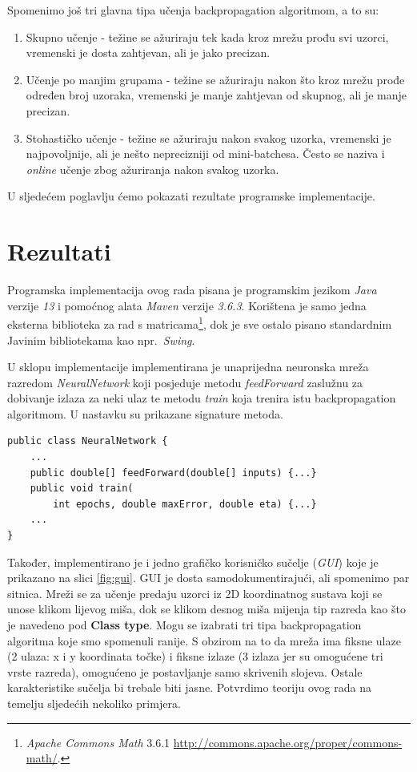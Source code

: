 \documentclass[times, utf8, zavrsni]{fer}
\begin{document}
\bigskip

Spomenimo još tri glavna tipa učenja backpropagation algoritmom, a to su:
\begin{enumerate}
    \item Skupno učenje  - težine se ažuriraju tek kada kroz mrežu prođu svi uzorci, vremenski je dosta zahtjevan, ali je jako precizan.
    \item Učenje po manjim grupama  - težine se ažuriraju nakon što kroz mrežu prođe određen broj uzoraka, vremenski je manje zahtjevan od skupnog, ali je manje precizan.
    \item Stohastičko učenje  - težine se ažuriraju nakon svakog uzorka, vremenski je najpovoljnije, ali je nešto neprecizniji od mini-batchesa. Često se naziva i \textit{online} učenje zbog ažuriranja nakon svakog uzorka.
\end{enumerate}

\bigskip
\bigskip

U sljedećem poglavlju ćemo pokazati rezultate programske implementacije.

\chapter{Rezultati}
Programska implementacija ovog rada pisana je programskim jezikom \textit{Java} verzije \textit{13} i pomoćnog alata \textit{Maven} verzije \textit{3.6.3}. Korištena je samo jedna eksterna biblioteka za rad s matricama\footnote{\textit{Apache Commons Math} 3.6.1 \url{http://commons.apache.org/proper/commons-math/}.}, dok je sve ostalo pisano standardnim Javinim bibliotekama kao npr.\ \textit{Swing}.

U sklopu implementacije implementirana je unaprijedna neuronska mreža razredom \textit{NeuralNetwork} koji posjeduje metodu \textit{feedForward} zaslužnu za dobivanje izlaza za neki ulaz te metodu \textit{train} koja trenira istu backpropagation algoritmom. U nastavku su prikazane signature metoda.
\begin{lstlisting}
public class NeuralNetwork {
    ...
    public double[] feedForward(double[] inputs) {...}
    public void train(
        int epochs, double maxError, double eta) {...}
    ...
}
\end{lstlisting}
Također, implementirano je i jedno grafičko korisničko sučelje (\textit{GUI}) koje je prikazano na slici \ref{fig:gui}. GUI je dosta samodokumentirajući, ali spomenimo par sitnica. Mreži se za učenje predaju uzorci iz 2D koordinatnog sustava koji se unose klikom lijevog miša, dok se klikom desnog miša mijenja tip razreda kao što je navedeno pod \textbf{Class type}. Mogu se izabrati tri tipa backpropagation algoritma koje smo spomenuli ranije. S obzirom na to da mreža ima fiksne ulaze (2 ulaza: x i y koordinata točke) i fiksne izlaze (3 izlaza jer su omogućene tri vrste razreda), omogućeno je postavljanje samo skrivenih slojeva. Ostale karakteristike sučelja bi trebale biti jasne. Potvrdimo teoriju ovog rada na temelju sljedećih nekoliko primjera.
\end{document}
